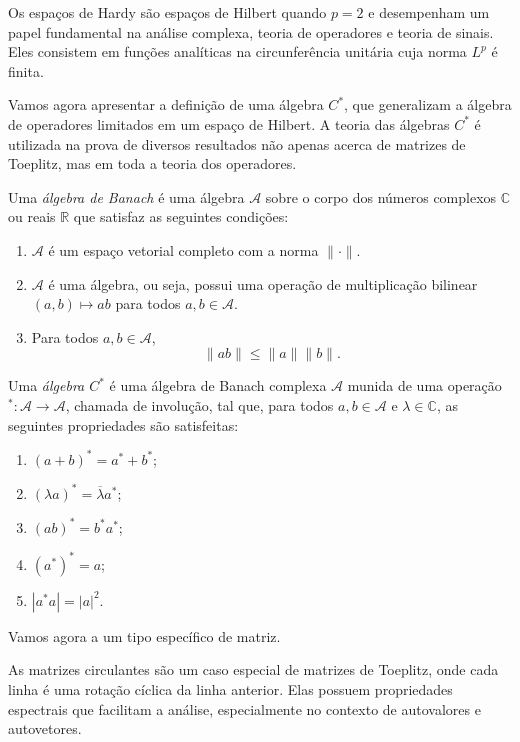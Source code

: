 Os espaços de Hardy são espaços de Hilbert quando $p = 2$ e desempenham um papel fundamental na análise complexa, teoria de operadores e teoria de sinais. Eles consistem em funções analíticas na circunferência unitária cuja norma $L^p$ é finita.

Vamos agora apresentar a definição de uma álgebra $C^\ast$, que generalizam a álgebra de operadores limitados em um espaço de Hilbert. A teoria das álgebras $C^\ast$ é utilizada na prova de diversos resultados não apenas acerca de matrizes de Toeplitz, mas em toda a teoria dos operadores.

\begin{definition*}
  Uma \textit{álgebra de Banach} é uma álgebra $\mathcal{A}$ sobre o corpo dos números complexos $\mathbb{C}$ ou reais $\mathbb{R}$ que satisfaz as seguintes condições:

  \begin{enumerate}
    \item $\mathcal{A}$ é um espaço vetorial completo com a norma $\|\cdot\|$.
    \item $\mathcal{A}$ é uma álgebra, ou seja, possui uma operação de multiplicação bilinear $(a, b) \mapsto ab$ para todos $a, b \in \mathcal{A}$.
    \item Para todos $a, b \in \mathcal{A}$,
    \[ \|ab\| \leq \|a\| \|b\|. \]
  \end{enumerate}
\end{definition*}

\begin{definition*} Uma \textit{álgebra $C^\ast$} é uma álgebra de Banach complexa $\mathcal{A}$ munida de uma operação $^\ast : \mathcal{A} \to \mathcal{A}$, chamada de involução, tal que, para todos $a, b \in \mathcal{A}$ e $\lambda \in \mathbb{C}$, as seguintes propriedades são satisfeitas:
  \begin{enumerate} \item $(a + b)^\ast = a^\ast + b^\ast$; \item $(\lambda a)^\ast = \overline{\lambda} a^\ast$; \item $(ab)^\ast = b^\ast a^\ast$; \item $(a^\ast)^\ast = a$; \item $|a^\ast a| = |a|^2$.
  \end{enumerate}
\end{definition*}

Vamos agora a um tipo específico de matriz.

As matrizes circulantes são um caso especial de matrizes de Toeplitz, onde cada linha é uma rotação cíclica da linha anterior. Elas possuem propriedades espectrais que facilitam a análise, especialmente no contexto de autovalores e autovetores.

